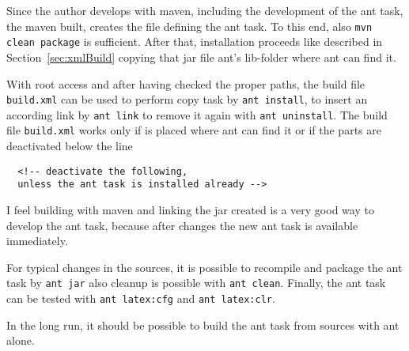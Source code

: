 Since the author develops with maven,
including the development of the ant task,
the maven built, creates the file \createdJar{}
defining the ant task.
To this end, also \texttt{mvn clean package} is sufficient.
After that, installation proceeds like described in Section~\ref{sec:xmlBuild}
copying that jar file ant's lib-folder where ant can find it.

With root access and after having checked the proper paths,
the build file \texttt{build.xml} can be used 
to perform copy task by \texttt{ant install},
to insert an according link by \texttt{ant link}
to remove it again with \texttt{ant uninstall}.
The build file \texttt{build.xml} works only
if \createdJar{} is placed where ant can find it
or if the parts are deactivated below the line
%
\begin{Verbatim}
  <!-- deactivate the following,
  unless the ant task is installed already -->
\end{Verbatim}

I feel building with maven and linking the jar created
is a very good way to develop the ant task,
because after changes the new ant task is available immediately.

For typical changes in the sources,
it is possible to recompile and package the ant task
by \texttt{ant jar} also cleanup is possible with \texttt{ant clean}.
Finally, the ant task can be tested with \texttt{ant latex:cfg}
and \texttt{ant latex:clr}. 

In the long run, it should be possible to build the ant task from sources
with ant alone.


